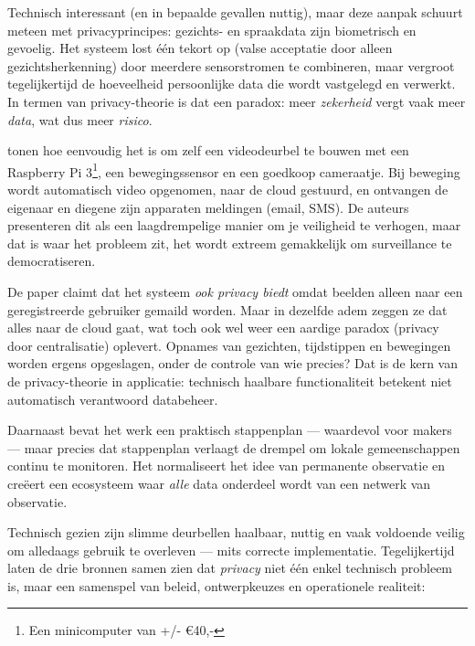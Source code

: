 \documentclass[nonacm, sigconf]{acmart}
\begin{document}
    Technisch interessant (en in bepaalde gevallen nuttig), maar deze aanpak schuurt meteen met privacyprincipes: gezichts- en spraakdata zijn biometrisch en gevoelig.
    Het systeem lost één tekort op (valse acceptatie door alleen gezichtsherkenning) door meerdere sensorstromen te combineren, maar vergroot tegelijkertijd de hoeveelheid persoonlijke data die wordt vastgelegd en verwerkt.
    In termen van privacy-theorie is dat een paradox: meer \emph{zekerheid} vergt vaak meer \emph{data}, wat dus meer \emph{risico}.

    \bigskip


    \parencite{lalitha2019smart} tonen hoe eenvoudig het is om zelf een videodeurbel te bouwen met een Raspberry Pi 3\footnote{Een minicomputer van +/- €40,-}, een bewegingssensor en een goedkoop cameraatje.
    Bij beweging wordt automatisch video opgenomen, naar de cloud gestuurd, en ontvangen de eigenaar en diegene zijn apparaten meldingen (email, SMS).
    De auteurs presenteren dit als een laagdrempelige manier om je veiligheid te verhogen, maar dat is waar het probleem zit, het wordt extreem gemakkelijk om surveillance te democratiseren.

    De paper claimt dat het systeem \emph{ook privacy biedt} omdat beelden alleen naar een geregistreerde gebruiker gemaild worden.
    Maar in dezelfde adem zeggen ze dat alles naar de cloud gaat, wat toch ook wel weer een aardige paradox (privacy door centralisatie) oplevert.
    Opnames van gezichten, tijdstippen en bewegingen worden ergens opgeslagen, onder de controle van wie precies?
    Dat is de kern van de privacy-theorie in applicatie: technisch haalbare functionaliteit betekent niet automatisch verantwoord databeheer.

    Daarnaast bevat het werk een praktisch stappenplan — waardevol voor makers — maar precies dat stappenplan verlaagt de drempel om lokale gemeenschappen continu te monitoren.
    Het normaliseert het idee van permanente observatie en creëert een ecosysteem waar \emph{alle} data onderdeel wordt van een netwerk van observatie.

    Technisch gezien zijn slimme deurbellen haalbaar, nuttig en vaak voldoende veilig om alledaags gebruik te overleven — mits correcte implementatie.
    Tegelijkertijd laten de drie bronnen samen zien dat \emph{privacy} niet één enkel technisch probleem is, maar een samenspel van beleid, ontwerpkeuzes en operationele realiteit:
\end{document}

